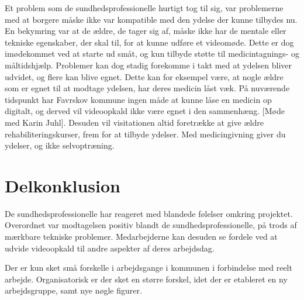 Et problem som de sundhedsprofessionelle hurtigt tog til sig, var problemerne med at borgere måske ikke var kompatible med den ydelse der kunne tilbydes nu. En bekymring var at de ældre, de tager sig af, måske ikke har de mentale eller tekniske egenskaber, der skal til, for at kunne udføre et videomøde. Dette er dog imødekommet ved at starte ud småt, og kun tilbyde støtte til medicintagnings- og måltidshjælp. Problemer kan dog stadig forekomme i takt med at ydelsen bliver udvidet, og flere kan blive egnet. Dette kan for eksempel være, at nogle ældre som er egnet til at modtage ydelsen, har deres medicin låst væk. På nuværende tidspunkt har Favrskov kommune ingen måde at kunne låse en medicin op digitalt, og derved vil videoopkald ikke være egnet i den sammenhæng. [Møde med Karin Juhl]. Desuden vil visitationen altid foretrække at give ældre rehabiliteringskurser, frem for at tilbyde ydelser. Med medicingivning giver du ydelser, og ikke selvoptræning.

\section{Delkonklusion}
De sundhedsprofessionelle har reageret med blandede følelser omkring projektet. Overordnet var modtagelsen positiv blandt de sundhedsprofessionelle, på trods af mærkbare tekniske problemer. Medarbejderne kan desuden se fordele ved at udvide videoopkald til andre aspekter af deres arbejdsdag. 

Der er kun sket små forskelle i arbejdsgange i kommunen i forbindelse med reelt arbejde. Organisatorisk er der sket en større forskel, idet der er etableret en ny arbejdsgruppe, samt nye nøgle figurer. \\

